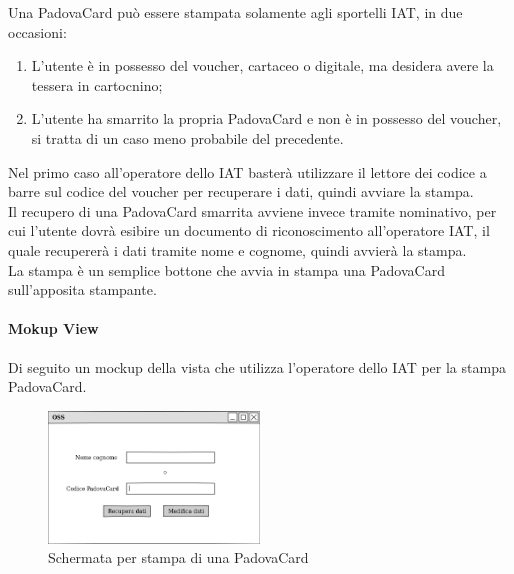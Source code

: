 \begin{table}[H]
\centering
{}
\caption{Controller:PrintsController}
\end{table}
Una PadovaCard può essere stampata solamente agli sportelli IAT, in due occasioni:
\begin{enumerate}
\item L'utente è in possesso del voucher, cartaceo o digitale, ma desidera avere la tessera in cartocnino;
\item L'utente ha smarrito la propria PadovaCard e non è in possesso del voucher, si tratta di un caso meno probabile del precedente.
\end{enumerate}
Nel primo caso all'operatore dello IAT basterà utilizzare il lettore dei codice a barre sul codice del voucher per recuperare i dati, quindi avviare la stampa. \\

Il recupero di una PadovaCard smarrita avviene invece tramite nominativo, per cui l'utente dovrà esibire un documento di riconoscimento all'operatore IAT, il quale recupererà i dati tramite nome e cognome, quindi avvierà la stampa. \\	

La stampa è un semplice bottone che avvia in stampa una PadovaCard sull'apposita stampante.

\paragraph{Mokup View}
Di seguito un mockup della vista che utilizza l'operatore dello IAT per la stampa PadovaCard.
\begin{figure}[H]
\centering
\includegraphics[width=0.5\textwidth]{images/mockup_stampa_tessera.png}
\caption{Schermata per stampa di una PadovaCard\label{stampaPadovaCard}}
\end{figure}


